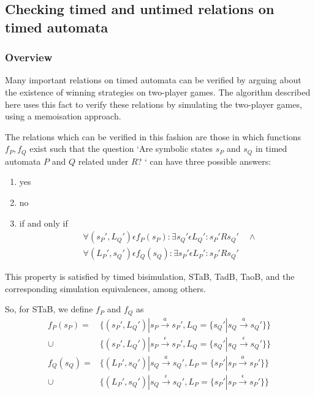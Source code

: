 \documentclass[a4paper]{llncs}
\begin{document}
\subsection{Checking timed and untimed relations on timed automata}

\subsubsection{Overview}

Many important relations on timed automata can be verified by arguing
about the existence of winning strategies on two-player games. The
algorithm described here uses this fact to verify these relations
by simulating the two-player games, using a memoisation approach.

The relations which can be verified in this fashion are those in which
functions $f_P, f_Q$ exist such that
the question `Are symbolic states $s_P$ and $s_Q$ in timed automata $P$ and $Q$
related under $R$? ` can have three possible answers:
\begin{enumerate}
\item yes
\item no
\item if and only if 
  \begin{align*} 
    &\forall (s_P', L_Q') \epsilon f_P(s_P): \exists s_Q' \epsilon
    L_Q': s_P' R s_Q' \quad \wedge \\
    &\forall (L_P', s_Q') \epsilon f_Q(s_Q): \exists s_P' \epsilon
    L_P': s_P' R s_Q'
  \end{align*} 
\end{enumerate}

This property is satisfied by timed bisimulation, STaB, TadB, TaoB,
and the corresponding simulation equivalences, among others.

So, for STaB, we define $f_P$ and $f_Q$ as
\begin{align*}
  f_P(s_P) = & \{(s_P', L_Q') | s_P \xrightarrow{a} s_P', 
  L_Q=\{ s_Q' | s_Q \xrightarrow{a} s_Q'\}\} \\
  \cup & \{(s_P', L_Q') | s_P \xrightarrow{\epsilon} s_P', 
  L_Q=\{ s_Q' | s_Q \xrightarrow{\epsilon} s_Q'\}\} \\
  f_Q(s_Q) = & \{(L_P', s_Q') | s_Q \xrightarrow{a} s_Q', 
  L_P=\{ s_P' | s_P \xrightarrow{a} s_P'\}\} \\
  \cup & \{(L_P', s_Q') | s_Q \xrightarrow{\epsilon} s_Q', 
  L_P=\{ s_P' | s_P \xrightarrow{\epsilon} s_P'\}\} 
\end{align*}
\end{document}
